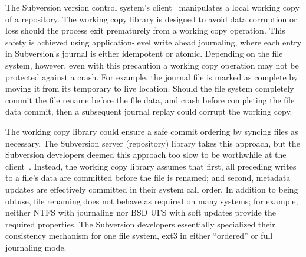 The Subversion version control system's client~\cite{svn} manipulates a
local working copy of a repository.
%
The working copy library is designed to avoid data corruption or loss
should the process exit prematurely from a working copy operation.
%
This safety is achieved using application-level write ahead journaling,
where each entry in Subversion's journal is either idempotent or
atomic.
%
Depending on the file system, however, even with this precaution a
working copy operation may not be protected against a crash.
%
For example, the journal file is marked as complete by moving it from
its temporary to live location.
%
Should the file system completely commit the file rename before
the file data, and crash before completing the file data commit, then
a subsequent journal replay could corrupt the working copy.

The working copy library could ensure a safe commit ordering by
syncing files as necessary. The Subversion server (repository) library
takes this approach, but
%
the Subversion
developers deemed this approach too slow to be worthwhile at the
client~\cite{svntradeoff}.
%
Instead, the working copy library assumes that
%
first, all preceding writes to a file's data are committed before the file
is renamed;
%
and second, metadata updates are effectively committed in their system call
order.
%
%
In addition to being obtuse, file renaming does not behave as required on
many systems; for example, neither NTFS with journaling nor BSD UFS with
soft updates provide the required properties.  The Subversion developers
essentially specialized their consistency mechanism for one file system,
ext3 in either ``ordered'' or full journaling mode.
%

